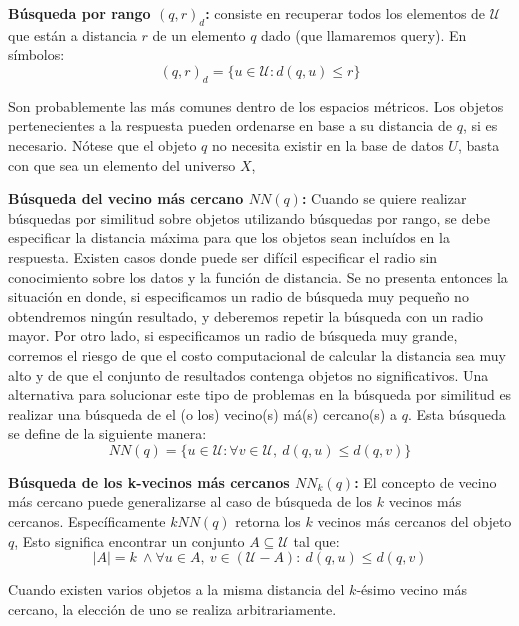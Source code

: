\begin{description}
   \item {\textbf{B\'usqueda por rango $(q,r)_{d}$:}}
          consiste en recuperar todos los elementos  de $\mathcal{U}$
          que est\'an a distancia $r$ de un elemento $q$ dado (que llamaremos
          query).  En s\'imbolos:
           \vspace{-3mm}
          \[(q,r)_{d}=\{u \in \mathcal{U}:  d(q,u) \leq r\}\]
          
          Son probablemente las m\'as comunes dentro de los espacios
           m\'etricos.  Los objetos pertenecientes a la respuesta pueden 
           ordenarse en base a su distancia de $q$, si es necesario.
            N\'otese que el objeto $q$ no necesita existir en la base de datos $U$,
            basta con que sea un elemento del universo $X$, 

   \item{\textbf{ B\'usqueda del vecino m\'as cercano $NN(q)$:}}
         Cuando se quiere realizar b\'usquedas por similitud sobre objetos 
         utilizando b\'usquedas por rango, se debe especificar la distancia 
         m\'axima para que los objetos sean inclu\'idos en la respuesta. Existen 
         casos donde puede ser dif\'icil especificar el radio sin conocimiento
          sobre los datos y la funci\'on de distancia. 
          Se no presenta entonces la situaci\'on en donde, si especificamos 
          un radio de b\'usqueda muy peque\~no no obtendremos ning\'un resultado, 
          y deberemos repetir la b\'usqueda con un radio mayor. 
          Por otro lado, si especificamos un radio de b\'usqueda 
          muy grande, corremos el riesgo de que el costo computacional de calcular 
          la distancia sea muy alto y de que el conjunto de resultados contenga 
          objetos no significativos. 
          Una alternativa para solucionar este tipo de problemas en la b\'usqueda por
           similitud es realizar una b\'usqueda de el (o los)  vecino(s) m\'a(s) cercano(s)
           a $q$. Esta b\'usqueda se define de la siguiente manera:
          \vspace{-3mm}
          \[ NN(q)=\{u \in \mathcal{U} : \forall v \in \mathcal{U},
          \ d(q,u) \leq d(q,v)\}\]
          

   \item {\textbf{ B\'usqueda de los k-vecinos m\'as cercanos $NN_{k}(q)$:}}
         El concepto de vecino m\'as cercano puede generalizarse al caso 
         de b\'usqueda de los $k$ vecinos m\'as cercanos. Espec\'ificamente
          $kNN(q)$ retorna los $k$ vecinos m\'as cercanos del objeto $q$, 
          Esto significa encontrar un conjunto
          $A \subseteq \mathcal{U} $ tal que:
          \vspace{-3mm}
         \[|A| =k \ \wedge \forall u \in A,\  v \in ( \mathcal{U} - A) :
          \ d(q,u) \leq d(q,v)\]
          
          Cuando existen varios objetos a la misma distancia del $k$-\'esimo 
          vecino m\'as cercano, la elecci\'on de uno se realiza arbitrariamente.
           
\end{description}

